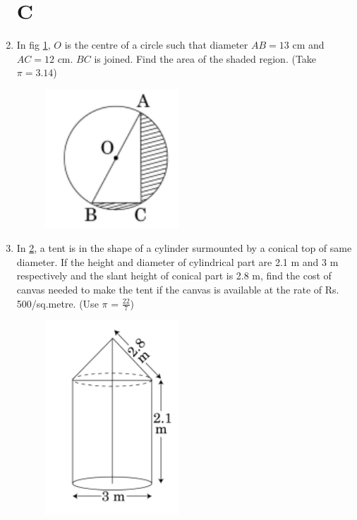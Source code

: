 \documentclass[book,11pt,onecolumn]{IEEEtran}
\begin{document}
\begin{enumerate}
\section{\textbf{C}}
\item  In fig \ref{figure_4}, $O$ is the centre of a circle such that diameter $AB = 13$ cm and $AC = 12$ cm. $BC$ is joined. Find the area of the shaded region. (Take $\pi = 3.14$)\\

	\begin{figure}[H]
      \centering
      \includegraphics[width=5cm]{figs/4.png}
      \caption{}
      \label{figure_4}
\end{figure} 

\item  In \ref{figure_5}, a tent is in the shape of a cylinder surmounted by a conical top of same diameter. If the height and diameter of cylindrical part are 2.1 m and 3 m respectively and the slant height of conical part is 2.8 m, find the cost of canvas needed to make the tent if the canvas is available at the rate of Rs. 500/sq.metre. (Use $\pi$ = $\frac{22}{7}$)\\
	\begin{figure}[H]
      \centering
      \includegraphics[width=5cm]{figs/5.png}
      \caption{}
      \label{figure_5}
\end{figure} 


\end{enumerate}
\end{document}

